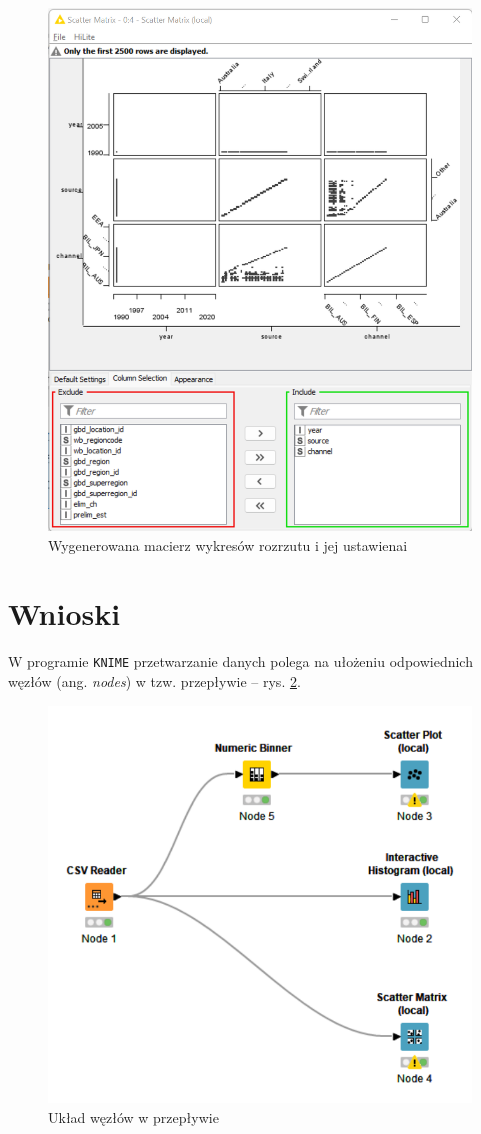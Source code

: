 \documentclass[11pt]{report}
\begin{document}
\begin{figure}[h]
    \centering
    \includegraphics[width=.8\textwidth]{scatter_matrix_2.png}
    \caption{Wygenerowana macierz wykresów rozrzutu i jej ustawienai\label{fig:scatter_matrix_2}}
\end{figure}

\chapter*{Wnioski}

W programie \texttt{KNIME} przetwarzanie danych polega na ułożeniu odpowiednich węzłów (ang. \textit{nodes}) w tzw. przepływie -- rys. \ref{fig:przestrzen_pracy}.

\begin{figure}[h]
    \centering
    \includegraphics[width=.8\textwidth]{przestrzen_pracy.png}
    \caption{Układ węzłów w przepływie\label{fig:przestrzen_pracy}}
\end{figure}
\end{document}
